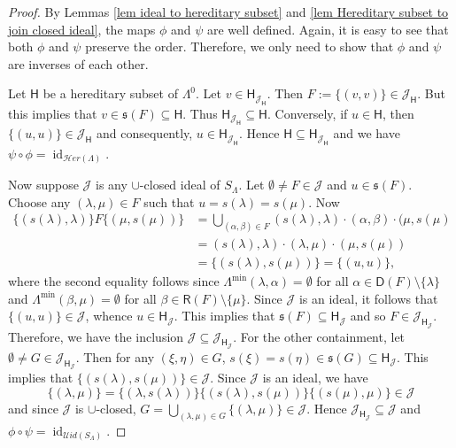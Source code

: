 \documentclass[a4paper,reqno,11pt]{amsart}
\numberwithin{equation}{section}
\theoremstyle{definition}
\theoremstyle{remark}
\newcommand{\id}{\operatorname{id}}
\begin{document}
\begin{proof}
By Lemmas \ref{lem ideal to hereditary subset} and \ref{lem Hereditary subset to join closed ideal}, the maps $\phi$ and $\psi$ are well defined. Again, it is easy to see that both $\phi$ and $\psi$ preserve the order. Therefore, we only need to show that $\phi$ and $\psi$ are inverses of each other. 

Let $\mathsf{H}$ be a hereditary subset of $\Lambda^0$. Let $v\in \mathsf{H}_{\mathcal{J}_\mathsf{H}}$. Then $F:=\{(v,v)\}\in \mathcal{J}_\mathsf{H}$. But this implies that $v\in \mathfrak{s}(F)\subseteq \mathsf{H}$. Thus $\mathsf{H}_{\mathcal{J}_\mathsf{H}}\subseteq \mathsf{H}$. Conversely, if $u\in \mathsf{H}$, then $\{(u,u)\}\in \mathcal{J}_\mathsf{H}$ and consequently, $u\in \mathsf{H}_{\mathcal{J}_\mathsf{H}}$. Hence $\mathsf{H}\subseteq \mathsf{H}_{\mathcal{J}_\mathsf{H}}$ and we have $\psi\circ \phi=\id_{\mathscr{H}er(\Lambda)}$.

Now suppose $\mathcal{J}$ is any $\cup$-closed ideal of $S_\Lambda$. Let $\emptyset \neq F\in \mathcal{J}$ and $u\in \mathfrak{s}(F)$. Choose any $(\lambda,\mu)\in F$ such that $u=s(\lambda)=s(\mu)$. Now 
\begin{align*}
\{(s(\lambda),\lambda)\}F\{(\mu,s(\mu))\}&=\displaystyle{\bigcup_{(\alpha,\beta)\in F}}(s(\lambda),\lambda)\cdot (\alpha,\beta)\cdot (\mu,s(\mu)\\
&=(s(\lambda),\lambda)\cdot (\lambda,\mu)\cdot (\mu,s(\mu))\\
&=\{(s(\lambda),s(\mu))\}=\{(u,u)\},
\end{align*}
where the second equality follows since $\Lambda^{\min}(\lambda,\alpha)=\emptyset$ for all $\alpha\in \mathsf{D}(F)\setminus \{\lambda\}$ and $\Lambda^{\min}(\beta,\mu)=\emptyset$ for all $\beta\in \mathsf{R}(F)\setminus \{\mu\}$. Since $\mathcal{J}$ is an ideal, it follows that $\{(u,u)\}\in \mathcal{J}$, whence $u\in \mathsf{H}_\mathcal{J}$. This implies that $\mathfrak{s}(F)\subseteq \mathsf{H}_\mathcal{J}$ and so $F\in \mathcal{J}_{\mathsf{H}_\mathcal{J}}$. Therefore, we have the inclusion $\mathcal{J}\subseteq \mathcal{J}_{\mathsf{H}_\mathcal{J}}$. For the other containment, let $\emptyset\neq G\in \mathcal{J}_{\mathsf{H}_\mathcal{J}}$. Then for any $(\xi,\eta)\in G$, $s(\xi)=s(\eta)\in \mathfrak{s}(G)\subseteq \mathsf{H}_\mathcal{J}$. This implies that $\{(s(\lambda),s(\mu))\}\in \mathcal{J}$. Since $\mathcal{J}$ is an ideal, we have \[\{(\lambda,\mu)\}=\{(\lambda,s(\lambda))\}\{(s(\lambda),s(\mu))\}\{(s(\mu),\mu)\}\in \mathcal{J}\] and since $\mathcal{J}$ is $\cup$-closed, $G=\displaystyle{\bigcup_{(\lambda,\mu)\in G}} \{(\lambda,\mu)\}\in \mathcal{J}$. Hence $\mathcal{J}_{\mathsf{H}_\mathcal{J}}\subseteq \mathcal{J}$ and $\phi\circ \psi=\id_{\mathscr{U}id(S_\Lambda)}$. 
\end{proof}
\end{document}
